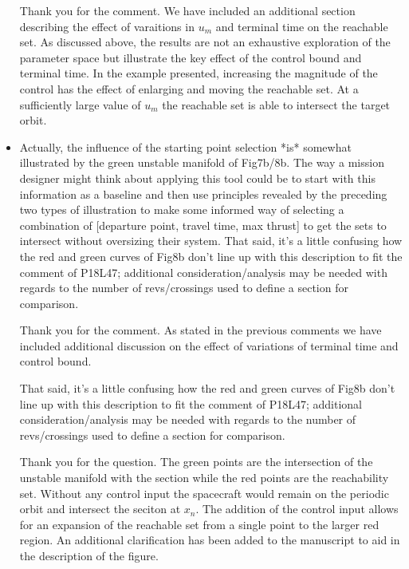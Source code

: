 \documentclass[11pt]{article}
\begin{document}
\begin{itemize}
        Thank you for the comment.
        We have included an additional section describing the effect of varaitions in \( u_m \) and terminal time on the reachable set.
        As discussed above, the results are not an exhaustive exploration of the parameter space but illustrate the key effect of the control bound and terminal time.
        In the example presented, increasing the magnitude of the control has the effect of enlarging and moving the reachable set. 
        At a sufficiently large value of \( u_m \) the reachable set is able to intersect the target orbit.

    \item 
        \begin{itshape}
            Actually, the influence of the starting point selection *is* somewhat illustrated by the green unstable manifold of Fig7b/8b.  The way a mission designer might think about applying this tool could be to start with this information as a baseline and then use principles revealed by the preceding two types of illustration to make some informed way of selecting a combination of [departure point, travel time, max thrust] to get the sets to intersect without oversizing their system.  That said, it's a little confusing how the red and green curves of Fig8b don't line up with this description to fit the comment of P18L47; additional consideration/analysis may be needed with regards to the number of revs/crossings used to define a section for comparison.
        \end{itshape}
        
        Thank you for the comment.
        As stated in the previous comments we have included additional discussion on the effect of variations of terminal time and control bound.

        \begin{itshape}
That said, it's a little confusing how the red and green curves of Fig8b don't line up with this description to fit the comment of P18L47; additional consideration/analysis may be needed with regards to the number of revs/crossings used to define a section for comparison.
        \end{itshape}
        
        Thank you for the question. 
        The green points are the intersection of the unstable manifold with the \Poincare section while the red points are the reachability set.
        Without any control input the spacecraft would remain on the periodic orbit and intersect the \Poincare seciton at \( x_n\). 
        The addition of the control input allows for an expansion of the reachable set from a single point to the larger red region.
        An additional clarification has been added to the manuscript to aid in the description of the figure.


\end{itemize}
\end{document}
